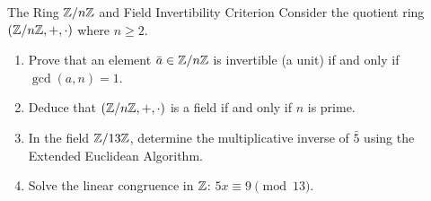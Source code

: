 \begin{exercise}{The Ring $\mathbb{Z}/n\mathbb{Z}$ and Field Invertibility Criterion}
Consider the quotient ring $(\mathbb{Z}/n\mathbb{Z}, +, \cdot)$ where $n \ge 2$.
\begin{enumerate}[leftmargin=1.5em,itemsep=2pt]
  \item Prove that an element $\bar{a} \in \mathbb{Z}/n\mathbb{Z}$ is invertible (a unit) if and only if $\gcd(a, n) = 1$.
  \item Deduce that $(\mathbb{Z}/n\mathbb{Z}, +, \cdot)$ is a field if and only if $n$ is prime.
  \item In the field $\mathbb{Z}/13\mathbb{Z}$, determine the multiplicative inverse of $\bar{5}$ using the Extended Euclidean Algorithm.
  \item Solve the linear congruence in $\mathbb{Z}$: $5x \equiv 9 \pmod{13}$.
\end{enumerate}
\end{exercise}

\begin{tabletworkspace}[5.0cm]
\end{tabletworkspace}

